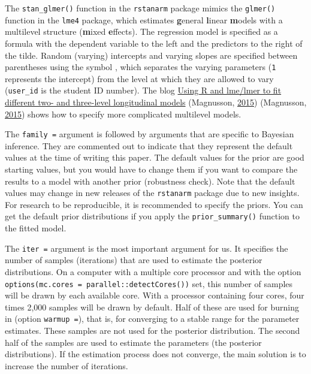 \documentclass[
  english,
  doc]{apa6}
\begin{document}
The \texttt{stan\_glmer()} function in the \texttt{rstanarm} package mimics the \texttt{glmer()} function in the \texttt{lme4} package, which estimates \textbf{g}eneral \textbf{l}inear \textbf{m}odels with a multilevel structure (\textbf{m}ixed \textbf{e}ffects). The regression model is specified as a formula with the dependent variable to the left and the predictors to the right of the tilde. Random (varying) intercepts and varying slopes are specified between parentheses using the symbol \texttt{\textbar{}}, which separates the varying parameters (\texttt{1} represents the intercept) from the level at which they are allowed to vary (\texttt{user\_id} is the student ID number). The blog \href{https://rpsychologist.com/r-guide-longitudinal-lme-lmer}{Using R and lme/lmer to fit different two- and three-level longitudinal models} (Magnusson, \protect\hyperlink{ref-magnussonUsingLmeLmer2015}{2015}) (Magnusson, \protect\hyperlink{ref-magnussonUsingLmeLmer2015}{2015}) shows how to specify more complicated multilevel models.

The \texttt{family\ =} argument is followed by arguments that are specific to Bayesian inference. They are commented out to indicate that they represent the default values at the time of writing this paper. The default values for the prior are good starting values, but you would have to change them if you want to compare the results to a model with another prior (robustness check). Note that the default values may change in new releases of the \texttt{rstanarm} package due to new insights. For research to be reproducible, it is recommended to specify the priors. You can get the default prior distributions if you apply the \texttt{prior\_summary()} function to the fitted model.

The \texttt{iter\ =} argument is the most important argument for us. It specifies the number of samples (iterations) that are used to estimate the posterior distributions. On a computer with a multiple core processor and with the option \texttt{options(mc.cores\ =\ parallel::detectCores())} set, this number of samples will be drawn by each available core. With a processor containing four cores, four times 2,000 samples will be drawn by default. Half of these are used for burning in (option \texttt{warmup\ =}), that is, for converging to a stable range for the parameter estimates. These samples are not used for the posterior distribution. The second half of the samples are used to estimate the parameters (the posterior distributions). If the estimation process does not converge, the main solution is to increase the number of iterations.
\end{document}
